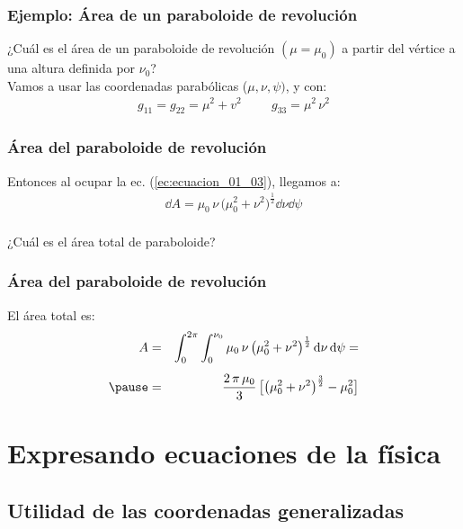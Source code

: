 \documentclass[12pt]{beamer}
\begin{document}
\begin{frame}
\frametitle{Ejemplo: Área de un paraboloide de revolución}
¿Cuál es el área de un paraboloide de revolución $(\mu = \mu_{0})$ a partir del vértice a una altura definida por $\nu_{0}$?
\\
\bigskip
\pause
Vamos a usar las coordenadas parabólicas ($\mu, \nu, \psi)$, y con:
\begin{align*}
g_{11} = g_{22} = \mu^{2} + v^{2} \hspace{1cm} g_{33} = \mu^{2} \, \nu^{2}
\end{align*}
\end{frame}
\begin{frame}
\frametitle{Área del paraboloide de revolución}
Entonces al ocupar la ec. (\ref{ec:ecuacion_01_03}), llegamos a: \pause
\begin{align*}
\dd{A} = \mu_{0} \, \nu \, \big( \mu_{0}^{2} + \nu^{2} \big)^{\frac{1}{2}} \dd{\nu} \dd{\psi}
\end{align*}
\\
\bigskip
\pause
¿Cuál es el área total de paraboloide?
\end{frame}
\begin{frame}
\frametitle{Área del paraboloide de revolución}
El área total es:
\begin{eqnarray*}
A &=& \int_{0}^{2 \pi} \int_{0}^{\nu_{0}} \mu_{0} \, \nu \, \big( \mu_{0}^{2} + \nu^{2} \big)^{\frac{1}{2}} \dd{\nu} \dd{\psi} = \\[0.5em] \pause
&=& \dfrac{2 \, \pi \, \mu_{0}}{3} \, \big[ \big( \mu_{0}^{2} + \nu^{2} \big)^{\frac{3}{2}} - \mu_{0}^{2} \big]
\end{eqnarray*}
\end{frame}
\section{Expresando ecuaciones de la física}
\subsection{Utilidad de las coordenadas generalizadas}
\end{document}
